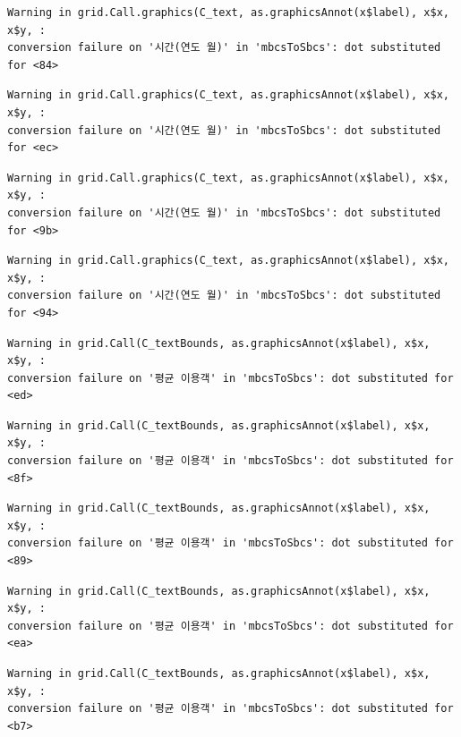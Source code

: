 \documentclass[
  letterpaper,
  DIV=11,
  numbers=noendperiod]{scrreprt}
\begin{document}
\begin{verbatim}
Warning in grid.Call.graphics(C_text, as.graphicsAnnot(x$label), x$x, x$y, :
conversion failure on '시간(연도 월)' in 'mbcsToSbcs': dot substituted for <84>
\end{verbatim}

\begin{verbatim}
Warning in grid.Call.graphics(C_text, as.graphicsAnnot(x$label), x$x, x$y, :
conversion failure on '시간(연도 월)' in 'mbcsToSbcs': dot substituted for <ec>
\end{verbatim}

\begin{verbatim}
Warning in grid.Call.graphics(C_text, as.graphicsAnnot(x$label), x$x, x$y, :
conversion failure on '시간(연도 월)' in 'mbcsToSbcs': dot substituted for <9b>
\end{verbatim}

\begin{verbatim}
Warning in grid.Call.graphics(C_text, as.graphicsAnnot(x$label), x$x, x$y, :
conversion failure on '시간(연도 월)' in 'mbcsToSbcs': dot substituted for <94>
\end{verbatim}

\begin{verbatim}
Warning in grid.Call(C_textBounds, as.graphicsAnnot(x$label), x$x, x$y, :
conversion failure on '평균 이용객' in 'mbcsToSbcs': dot substituted for <ed>
\end{verbatim}

\begin{verbatim}
Warning in grid.Call(C_textBounds, as.graphicsAnnot(x$label), x$x, x$y, :
conversion failure on '평균 이용객' in 'mbcsToSbcs': dot substituted for <8f>
\end{verbatim}

\begin{verbatim}
Warning in grid.Call(C_textBounds, as.graphicsAnnot(x$label), x$x, x$y, :
conversion failure on '평균 이용객' in 'mbcsToSbcs': dot substituted for <89>
\end{verbatim}

\begin{verbatim}
Warning in grid.Call(C_textBounds, as.graphicsAnnot(x$label), x$x, x$y, :
conversion failure on '평균 이용객' in 'mbcsToSbcs': dot substituted for <ea>
\end{verbatim}

\begin{verbatim}
Warning in grid.Call(C_textBounds, as.graphicsAnnot(x$label), x$x, x$y, :
conversion failure on '평균 이용객' in 'mbcsToSbcs': dot substituted for <b7>
\end{verbatim}
\end{document}
